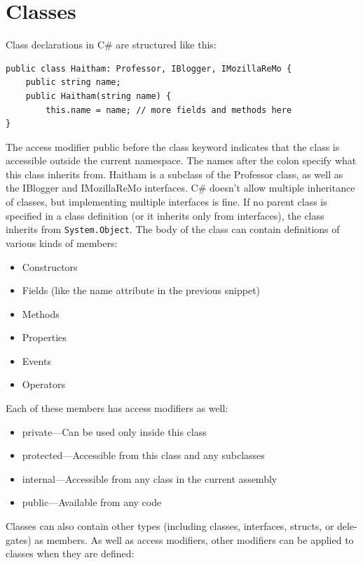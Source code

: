 \documentclass[12pt,a4paper,final,twoside,titlepage]{book}
\begin{document}
\section{Classes}
Class declarations in C\# are structured like this:
\lstset{language=csh, tabsize=4}
 \begin{lstlisting}
public class Haitham: Professor, IBlogger, IMozillaReMo { 
	public string name; 
	public Haitham(string name) {
		this.name = name; // more fields and methods here
}
\end{lstlisting}
The access modifier public before the class keyword indicates that the class is accessible outside the current namespace. The names after the colon specify what this class inherits from. Haitham is a subclass of the Professor class, as well as the IBlogger and IMozillaReMo interfaces. C\# doesn’t allow multiple inheritance of classes, but implementing multiple interfaces is fine. If no parent class is specified in a class definition (or it inherits only from interfaces), the class inherits from \texttt{System.Object}. The body of the class can contain definitions of various kinds of members:
\begin{itemize}
\item Constructors 
\item Fields (like the name attribute in the previous snippet) 
\item Methods 
\item Properties 
\item Events 
\item Operators
\end{itemize}
Each of these members has access modifiers as well:
\begin{itemize}
\item private—Can be used only inside this class 
\item protected—Accessible from this class and any subclasses 
\item internal—Accessible from any class in the current assembly 
\item public—Available from any code
\end{itemize}
Classes can also contain other types (including classes, interfaces, structs, or dele- gates) as members.
As well as access modifiers, other modifiers can be applied to classes when they are defined:
\end{document}
